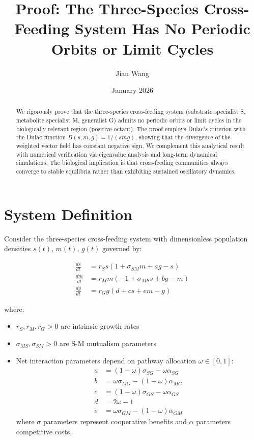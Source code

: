 \documentclass[11pt]{article}
\title{Proof: The Three-Species Cross-Feeding System Has No Periodic Orbits or Limit Cycles}
\author{Jian Wang}
\date{January 2026}
\begin{document}
\maketitle

\begin{abstract}
We rigorously prove that the three-species cross-feeding system (substrate specialist S, metabolite specialist M, generalist G) admits no periodic orbits or limit cycles in the biologically relevant region (positive octant). The proof employs Dulac's criterion with the Dulac function $B(s,m,g) = 1/(smg)$, showing that the divergence of the weighted vector field has constant negative sign. We complement this analytical result with numerical verification via eigenvalue analysis and long-term dynamical simulations. The biological implication is that cross-feeding communities always converge to stable equilibria rather than exhibiting sustained oscillatory dynamics.
\end{abstract}

\section{System Definition}

Consider the three-species cross-feeding system with dimensionless population densities $s(t)$, $m(t)$, $g(t)$ governed by:

\begin{align}
\frac{ds}{dt} &= r_S s \left(1 + \sigma_{SM} m + a g - s\right) \label{eq:s}\\
\frac{dm}{dt} &= r_M m \left(-1 + \sigma_{MS} s + b g - m\right) \label{eq:m}\\
\frac{dg}{dt} &= r_G g \left(d + c s + e m - g\right) \label{eq:g}
\end{align}

where:
\begin{itemize}
    \item $r_S, r_M, r_G > 0$ are intrinsic growth rates
    \item $\sigma_{MS}, \sigma_{SM} > 0$ are S-M mutualism parameters
    \item Net interaction parameters depend on pathway allocation $\omega \in [0,1]$:
    \begin{align*}
        a &= (1-\omega)\sigma_{SG} - \omega\alpha_{SG}\\
        b &= \omega\sigma_{MG} - (1-\omega)\alpha_{MG}\\
        c &= (1-\omega)\sigma_{GS} - \omega\alpha_{GS}\\
        d &= 2\omega - 1\\
        e &= \omega\sigma_{GM} - (1-\omega)\alpha_{GM}
    \end{align*}
    where $\sigma$ parameters represent cooperative benefits and $\alpha$ parameters competitive costs.
\end{itemize}
\end{document}

